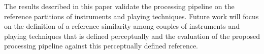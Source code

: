 \documentclass{article}
\begin{document}
The results described in this paper validate the processing pipeline on the reference partitions of instruments and playing techniques. Future work will focus on the definition of a reference similarity among couples of instruments and playing techniques that is defined perceptually and the evaluation of the proposed processing pipeline against this perceptually defined reference.










\end{document}
